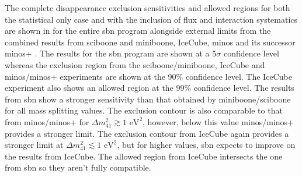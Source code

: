 The complete \numu disappearance exclusion sensitivities and allowed regions for both the statistical only case and with the inclusion of flux and interaction systematics are shown in  for the entire \gls{sbn} program alongside external limits from the combined results from \gls{sciboone} and \gls{miniboone}, IceCube, \gls{minos} and its successor \gls{minos}+ \cite{MiniBooNE/SciBooNE_numu_disapp_contour} \cite{MINOS}\cite{IceCube_numu_disapp_contour}\cite{MINOS+}. The results for the \gls{sbn} program are shown at a 5$\sigma$ confidence level whereas the exclusion region from the \gls{sciboone}/\gls{miniboone}, IceCube and \gls{minos}/\gls{minos}+ experiments are shown at the 90\% confidence level. The IceCube experiment also shows an allowed region at the 99\% confidence level. The results from \gls{sbn} show a stronger sensitivity than that obtained by \gls{miniboone}/\gls{sciboone} for all mass splitting values. The exclusion contour is also comparable to that from \gls{minos}/\gls{minos}+ for $\Delta m^2_{41} \gtrsim 1\text{ eV}^2$, however, below this value \gls{minos}/\gls{minos}+ provides a stronger limit. The exclusion contour from IceCube again provides a stronger limit at $\Delta m^2_{41} \lesssim 1\text{ eV}^2$, but for higher values, \gls{sbn} expects to improve on the results from IceCube. The allowed region from IceCube intersects the one from \gls{sbn} so they aren't fully compatible. 

